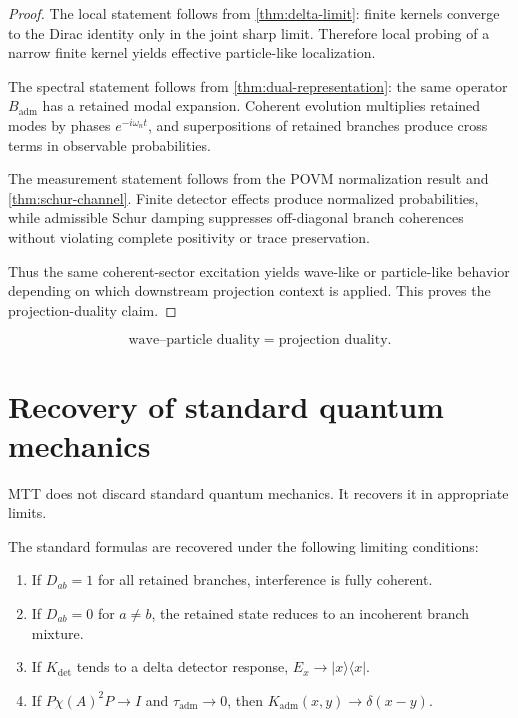 \documentclass[11pt]{article}
\newcommand{\Kadm}{K_{\mathrm{adm}}}
\newcommand{\Badm}{B_{\mathrm{adm}}}
\newcommand{\ta}{\tau_{\mathrm{adm}}}
\begin{document}
\begin{proof}
The local statement follows from \cref{thm:delta-limit}: finite kernels converge to the
Dirac identity only in the joint sharp limit. Therefore local probing of a narrow finite kernel
yields effective particle-like localization.

The spectral statement follows from \cref{thm:dual-representation}: the same operator
\(\Badm\) has a retained modal expansion. Coherent evolution multiplies retained modes by
phases \(e^{-i\omega_nt}\), and superpositions of retained branches produce cross terms in
observable probabilities.

The measurement statement follows from the POVM normalization result and
\cref{thm:schur-channel}. Finite detector effects produce normalized probabilities, while
admissible Schur damping suppresses off-diagonal branch coherences without violating
complete positivity or trace preservation.

Thus the same coherent-sector excitation yields wave-like or particle-like behavior depending
on which downstream projection context is applied. This proves the projection-duality claim.
\end{proof}

\[
  \boxed{\text{wave--particle duality}=\text{projection duality}.}
\]

\section{Recovery of standard quantum mechanics}

MTT does not discard standard quantum mechanics. It recovers it in appropriate limits.

\begin{proposition}
The standard formulas are recovered under the following limiting conditions:
\begin{enumerate}[label=(\roman*)]
  \item If \(D_{ab}=1\) for all retained branches, interference is fully coherent.
  \item If \(D_{ab}=0\) for \(a\ne b\), the retained state reduces to an incoherent branch
  mixture.
  \item If \(K_{\det}\) tends to a delta detector response, \(E_x\to |x\rangle\langle x|\).
  \item If \(P\chi(A)^2P\to I\) and \(\ta\to0\), then \(\Kadm(x,y)\to\delta(x-y)\).
\end{enumerate}
\end{proposition}
\end{document}
